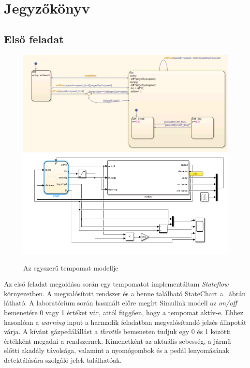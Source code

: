 \chapter{Jegyzőkönyv}

\section{Első feladat}
\begin{figure}[!ht]
	\centering
	\includegraphics[width=120mm,keepaspectratio]{figures/2m04/f2_chart_2.png}
	\includegraphics[width=120mm,keepaspectratio]{figures/2m04/f2_model_2.png}
	\caption{Az egyszerű tempomat modellje}
	\label{fig:chart1}
\end{figure}
Az első feladat megoldása során egy tempomatot implementáltam \textit{Stateflow} környezetben. A megvalósított rendszer és a benne található StateChart a ~ábrán látható. A laboratórium során használt előre megírt Simulink modell az \textit{on/off} bemenetére 0 vagy 1 értéket vár, attól függően, hogy a tempomat aktív-e. Ehhez hasonlóan a \textit{warning} input a harmadik feladatban megvalósítandó jelzés állapotát várja. A kívánt gázpedálállást a \textit{throttle} bemeneten tudjuk egy 0 és 1 közötti értékként megadni a rendszernek. Kimenetként az aktuális sebesség, a jármű előtti akadály távolsága, valamint a nyomógombok és a pedál lenyomásának detektálására szolgáló jelek találhatóak.



